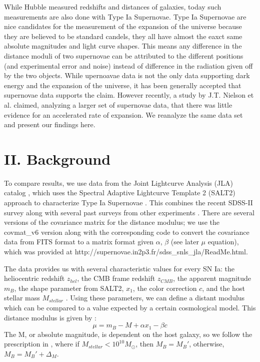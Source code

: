 \documentclass[aps,prl,reprint]{revtex4-1}
\begin{document}
While Hubble measured redshifts and distances of galaxies, today such measurements are also done with Type Ia Supernovae. Type Ia Supernovae are nice candidates for the measurement of the expansion of the universe because they are believed to be standard candels, they all have almost the eaxct same absolute magnitudes and light curve shapes. This means any difference in the distance moduli of two supernovae can be attributed to the different positions (and experimental error and noise) instead of difference in the radiation given off by the two objects. While upernoavae data is not the only data supporting dark energy and the expansion of the universe, it has been generally accepted that supernovae data supports the claim. However recently, a study by J.T. Nielson et al. \cite{shocker} claimed, analyzing a larger set of supernovae data, that there was little evidence for an accelerated rate of expansion. We reanalyze the same data set and present our findings here.
\section{II. Background}
To compare results, we use data from the Joint Lightcurve Analysis (JLA) catalog \cite{sdss}, which uses the Spectral Adaptive Lightcurve Template 2 (SALT2) approach to characterize Type Ia Supernovae \cite{salt2}. This combines the recent SDSS-II survey along with several past surveys from other experiments \cite{sdss}. There are several versions of the covariance matrix for the distance modulus; we use the covmat\_v6 version along with the corresponding code to convert the covariance data from FITS format \cite{fits} to a matrix format given $\alpha$, $\beta$ (see later $\mu$ equation), which was provided at http://supernovae.in2p3.fr/sdss\_snls\_jla/ReadMe.html. 
\par The data provides us with several characteristic values for every SN Ia: the heliocentric redshift $z_{hel}$, the CMB frame redshift $z_{CMB}$, the apparent magnitude $m_B$, the shape parameter from SALT2, $x_1$, the color correction $c$, and the host stellar mass $M_{stellar}$ \cite{sdss}. Using these parameters, we can define a distant modulus which can be compared to a value expected by a certain cosmological model. This distance modulus is given by \cite{sdss}: 
\begin{equation}
\mu = m_B - M + \alpha x_1 - \beta c
\end{equation}
The M, or absolute magnitude, is dependent on the host galaxy, so we follow the prescription in \cite{sdss}, where if $M_{stellar} < 10^{10} M_{\odot}$, then $M_B = M_B'$, otherwise, $M_B = M_B' + \Delta_M$. 
\end{document}

